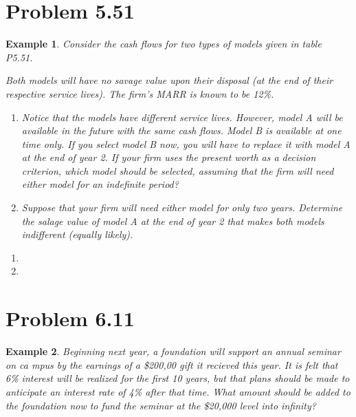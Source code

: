 \documentclass{report} %
\newtheorem{exmp}{Example}
\begin{document}
\section*{Problem 5.51}
\begin{exmp}
    Consider the cash flows for two types of models given in table P5.51. 

    Both models will have no savage value upon their disposal (at the end of their respective service lives). The firm's MARR is known to be 12\%.

    \begin{enumerate}
        \item Notice that the models have different service lives. However, model A will be available in the future with the same cash flows. Model B is available at one time only. If you select model B now, you will have to replace it with model A at the end of year 2. If your firm uses the present worth as a decision criterion, which model should be selected, assuming that the firm will need either model for an indefinite period?
        \item Suppose that your firm will need either model for only two years. Determine the salage value of model A at the end of year 2 that makes both models indifferent (equally likely).
    \end{enumerate}
\end{exmp}
\begin{enumerate}
    \item {}
    \item {}
\end{enumerate}

\section*{Problem 6.11}
\begin{exmp}
    Beginning next year, a foundation will support an annual seminar on ca mpus by the earnings of a \$200,00 gift it recieved this year. It is felt that 6\% interest will be realized for the first 10 years, but that plans should be made to anticipate an interest rate of 4\% after that time. What amount should be added to the foundation now to fund the seminar at the \$20,000 level into infinity?
\end{exmp}
\begin{center}
\end{center}
\end{document}

